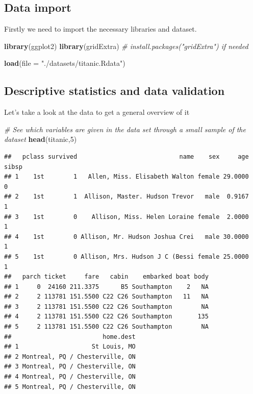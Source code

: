 \documentclass[12,]{article}
\newenvironment{Shaded}{\begin{snugshade}}{\end{snugshade}}
\newcommand{\KeywordTok}[1]{\textcolor[rgb]{0.13,0.29,0.53}{\textbf{{#1}}}}
\newcommand{\DataTypeTok}[1]{\textcolor[rgb]{0.13,0.29,0.53}{{#1}}}
\newcommand{\DecValTok}[1]{\textcolor[rgb]{0.00,0.00,0.81}{{#1}}}
\newcommand{\StringTok}[1]{\textcolor[rgb]{0.31,0.60,0.02}{{#1}}}
\newcommand{\CommentTok}[1]{\textcolor[rgb]{0.56,0.35,0.01}{\textit{{#1}}}}
\newcommand{\NormalTok}[1]{{#1}}
\begin{document}
\subsection{Data import}\label{data-import}

Firstly we need to import the necessary libraries and dataset.

\begin{Shaded}
\begin{Highlighting}[]
\KeywordTok{library}\NormalTok{(ggplot2)}
\KeywordTok{library}\NormalTok{(gridExtra) }\CommentTok{# install.packages("gridExtra") if needed}

\KeywordTok{load}\NormalTok{(}\DataTypeTok{file =} \StringTok{"./datasets/titanic.Rdata"}\NormalTok{)}
\end{Highlighting}
\end{Shaded}

\subsection{Descriptive statistics and data
validation}\label{descriptive-statistics-and-data-validation}

Let's take a look at the data to get a general overview of it

\begin{Shaded}
\begin{Highlighting}[]
  \CommentTok{# See which variables are given in the data set through a small sample of the dataset}
\KeywordTok{head}\NormalTok{(titanic,}\DecValTok{5}\NormalTok{)}
\end{Highlighting}
\end{Shaded}

\begin{verbatim}
##   pclass survived                            name    sex     age sibsp
## 1    1st        1   Allen, Miss. Elisabeth Walton female 29.0000     0
## 2    1st        1  Allison, Master. Hudson Trevor   male  0.9167     1
## 3    1st        0    Allison, Miss. Helen Loraine female  2.0000     1
## 4    1st        0 Allison, Mr. Hudson Joshua Crei   male 30.0000     1
## 5    1st        0 Allison, Mrs. Hudson J C (Bessi female 25.0000     1
##   parch ticket     fare   cabin    embarked boat body
## 1     0  24160 211.3375      B5 Southampton    2   NA
## 2     2 113781 151.5500 C22 C26 Southampton   11   NA
## 3     2 113781 151.5500 C22 C26 Southampton        NA
## 4     2 113781 151.5500 C22 C26 Southampton       135
## 5     2 113781 151.5500 C22 C26 Southampton        NA
##                         home.dest
## 1                    St Louis, MO
## 2 Montreal, PQ / Chesterville, ON
## 3 Montreal, PQ / Chesterville, ON
## 4 Montreal, PQ / Chesterville, ON
## 5 Montreal, PQ / Chesterville, ON
\end{verbatim}
\end{document}
